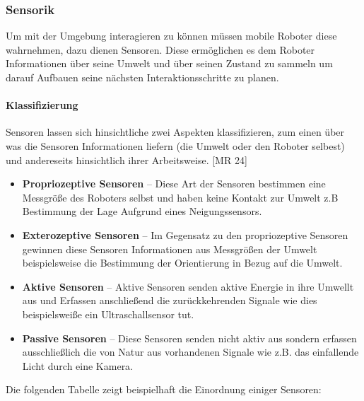 \subsubsection{Sensorik}
\color{finishing}
Um mit der Umgebung interagieren zu können müssen mobile Roboter diese wahrnehmen, dazu dienen Sensoren. Diese ermöglichen es dem Roboter Informationen über seine Umwelt und über seinen Zustand zu sammeln um darauf Aufbauen seine nächsten Interaktionsschritte zu planen.
\paragraph{Klassifizierung}
\color{finishing}
Sensoren lassen sich hinsichtliche zwei Aspekten klassifizieren, zum einen über was die Sensoren Informationen liefern (die Umwelt oder den Roboter selbest) und andereseits hinsichtlich ihrer Arbeitsweise. [MR 24]
\begin{itemize}
	\item{\textbf{Propriozeptive Sensoren}} -- Diese Art der Sensoren bestimmen eine Messgröße des Roboters selbst und haben keine \glqq{}Kontakt\grqq{} zur Umwelt z.B Bestimmung der Lage Aufgrund eines Neigungssensors.
	\item{\textbf{Exterozeptive Sensoren}} -- Im Gegensatz zu den propriozeptive Sensoren gewinnen diese Sensoren Informationen aus Messgrößen der Umwelt beispielsweise die Bestimmung der Orientierung in Bezug auf die Umwelt.
	\item{\textbf{Aktive Sensoren}} -- Aktive Sensoren senden aktive Energie in ihre Umwellt aus und Erfassen anschließend die zurückkehrenden Signale wie dies beispielsweiße ein Ultraschallsensor tut.
	\item{\textbf{Passive Sensoren}} -- Diese Sensoren senden nicht aktiv aus sondern erfassen ausschließlich die von Natur aus vorhandenen Signale wie z.B. das einfallende Licht durch eine Kamera.
\end{itemize}
Die folgenden Tabelle zeigt beispielhaft die Einordnung einiger Sensoren:
